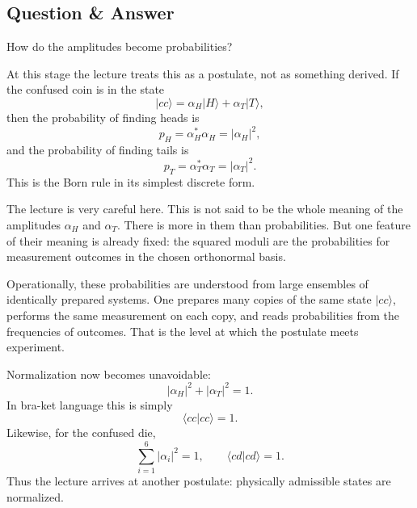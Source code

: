 \subsection{Question \& Answer}

How do the amplitudes become probabilities?

At this stage the lecture treats this as a postulate, not as something derived. If the confused coin is in the state
\begin{equation}
|cc\rangle = \alpha_H |H\rangle + \alpha_T |T\rangle,
\end{equation}
then the probability of finding heads is
\begin{equation}
p_H = \alpha_H^* \alpha_H = |\alpha_H|^2,
\end{equation}
and the probability of finding tails is
\begin{equation}
p_T = \alpha_T^* \alpha_T = |\alpha_T|^2.
\end{equation}
This is the Born rule in its simplest discrete form.

The lecture is very careful here. This is not said to be the whole meaning of the amplitudes \(\alpha_H\) and \(\alpha_T\). There is more in them than probabilities. But one feature of their meaning is already fixed: the squared moduli are the probabilities for measurement outcomes in the chosen orthonormal basis.

Operationally, these probabilities are understood from large ensembles of identically prepared systems. One prepares many copies of the same state \(|cc\rangle\), performs the same measurement on each copy, and reads probabilities from the frequencies of outcomes. That is the level at which the postulate meets experiment.

Normalization now becomes unavoidable:
\begin{equation}
|\alpha_H|^2 + |\alpha_T|^2 = 1.
\end{equation}
In bra-ket language this is simply
\begin{equation}
\langle cc|cc\rangle = 1.
\end{equation}
Likewise, for the confused die,
\begin{equation}
\sum_{i=1}^6 |\alpha_i|^2 = 1,
\qquad
\langle cd|cd\rangle = 1.
\end{equation}
Thus the lecture arrives at another postulate: physically admissible states are normalized.

